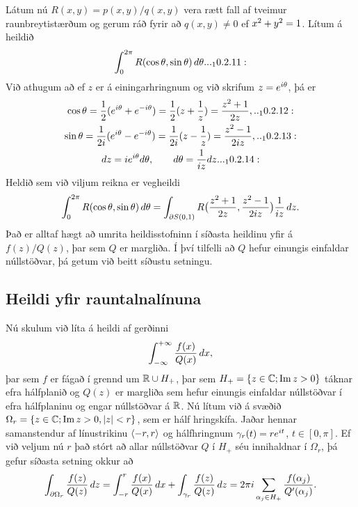 Látum nú $R(x,y)=p(x,y)/q(x,y)$ vera rætt fall af tveimur
raunbreytistærð\-um og gerum ráð fyrir að $q(x,y)\neq 0$ ef $x\sp
2+y\sp 2=1$.  Lítum á heildið 
 \begin{equation*}\int_0\sp{2\pi} R(\cos\theta,\sin \theta) \, d\theta.

.. _10.2.11:

 \end{equation*}
Við athugum að ef $z$  er á einingarhringnum og við skrifum
$z=e\sp{i\theta}$, þá er 
\begin{gather*}
\cos\theta=\dfrac 12(e\sp{i\theta}+e\sp{-i\theta})
=\dfrac12(z+\dfrac 1z)=\dfrac{z\sp 2+1}{2z},

.. _10.2.12:
\\ 
\sin\theta=\dfrac 1{2i}(e\sp{i\theta}-e\sp{-i\theta})
=\dfrac1{2i}(z-\dfrac 1z)=\dfrac{z\sp 2-1}{2iz},

.. _10.2.13:
\\ 
dz=ie\sp{i\theta}d\theta, \qquad d\theta=\dfrac 1{iz}dz.

.. _10.2.14:

\end{gather*}
Heldið sem við viljum reikna er vegheildi
$$
\int_0\sp {2\pi}R(\cos\theta,\sin
\theta)\, d\theta =
\int_{\partial S(0,1)}R\big(\dfrac{z\sp 2+1}{2z},\dfrac{z\sp 2-1}{2iz}\big)
\dfrac 1{iz}\, dz.
$$
Það er alltaf hægt að umrita heildisstofninn í síðasta heildinu yfir
á $f(z)/Q(z)$, þar sem $Q$ er margliða. Í því tilfelli að $Q$ hefur 
einungis einfaldar núllstöðvar, þá getum við beitt síðustu  setningu.


\subsection*{Heildi yfir rauntalnalínuna}


Nú skulum við líta á heildi af gerðinni 
 $$\int_{-\infty}\sp{+\infty}\dfrac{f(x)}{Q(x)}\, dx,
 $$
þar sem $f$ er fágað í grennd um ${\mathbb R}\cup H_+$, þar sem $H_+=\{z\in
{\mathbb C}; {\operatorname{Im\, }} z>0\}$ táknar efra hálfplanið og $Q(z)$ er margliða sem hefur
einungis einfaldar núllstöðvar í efra hálfplaninu og engar
núllstöðvar á ${\mathbb R}$.  Nú lítum við á svæðið
$\Omega_r=\{z\in {\mathbb C}; {\operatorname{Im\, }} z>0, |z|<r\}$, sem er hálf hringskífa.
Jaðar hennar samanstendur af línustrikinu ${\langle-r,r\rangle}$ og
hálfhringnum $\gamma_r(t)=re\sp{it}$, $t\in [0,\pi]$. Ef við veljum nú
$r$ það stórt að allar núllstöðvar $Q$ í $H_+$ séu 
innihaldnar í $\Omega_r$, þá gefur
síðasta setning okkur að 
 $$
\int_{\partial\Omega_r} \dfrac {f(z)}{Q(z)}\, dz
=\int_{-r}\sp r \dfrac {f(x)}{Q(x)}\, dx +
\int_{\gamma_r}\dfrac{f(z)}{Q(z)}\, dz = 
2\pi i\sum_{\alpha_j\in H_+} \dfrac{f(\alpha_j)}{Q{\sp{\prime}}(\alpha_j)}.
 $$

